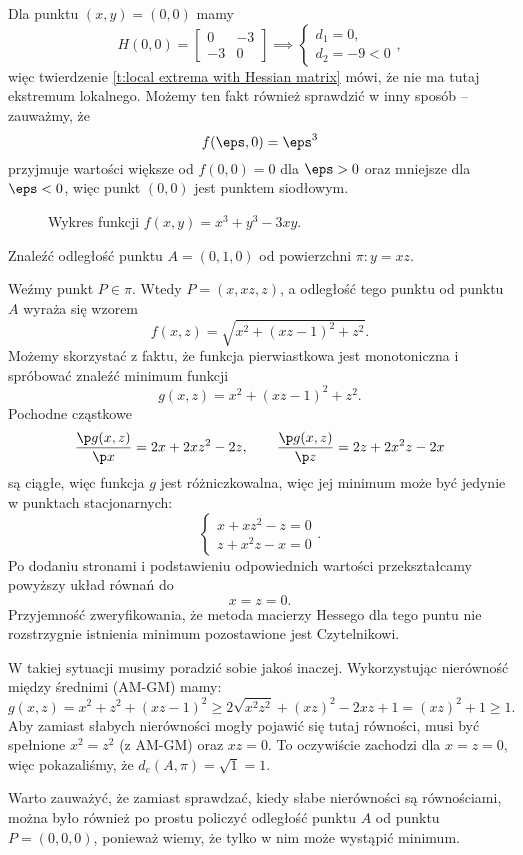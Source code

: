\begin{solution}
    Dla punktu $(x, y) = (0, 0)$ mamy
    \[ H(0, 0) = \begin{bmatrix}
        0 & -3 \\
        -3 & 0
    \end{bmatrix} \implies \begin{cases} d_1 = 0,\\ d_2 = -9 < 0 \end{cases}, \]
    więc twierdzenie \ref{t:local extrema with Hessian matrix} mówi, że nie ma tutaj ekstremum lokalnego. Możemy ten fakt również sprawdzić w inny sposób -- zauważmy, że
    \[ f(\eps, 0) = \eps^3 \]
    przyjmuje wartości większe od $f(0, 0) = 0$ dla $\eps > 0$ oraz mniejsze dla $\eps < 0$, więc punkt $(0, 0)$ jest punktem siodłowym.
\end{solution}

\begin{figure}[H]
    \centering
    \caption{Wykres funkcji $f(x, y) = x^3 + y^3 - 3xy$.}
\end{figure}

\begin{example}
    Znaleźć odległość punktu $A = (0, 1, 0)$ od powierzchni $\pi : y = xz$.
\end{example}
\begin{solution}
    Weźmy punkt $P \in \pi$. Wtedy $P = (x, xz, z)$, a odległość tego punktu od punktu $A$ wyraża się wzorem
    \[ f(x, z) = \sqrt{x^2 + (xz- 1)^2 + z^2}. \]
    Możemy skorzystać z faktu, że funkcja pierwiastkowa jest monotoniczna i spróbować znaleźć minimum funkcji
    \[ g(x, z) = x^2 + (xz - 1)^2 + z^2. \]
    Pochodne cząstkowe
    \[ \frac{\p g(x, z)}{\p x} = 2x + 2xz^2 - 2z, \qquad \frac{\p g(x, z)}{\p z} = 2z + 2x^2z - 2x \]
    są ciągłe, więc funkcja $g$ jest różniczkowalna, więc jej minimum może być jedynie w punktach stacjonarnych:
    \[ \begin{cases} x + xz^2 - z = 0 \\ z + x^2z - x = 0 \end{cases}. \]
    Po dodaniu stronami i podstawieniu odpowiednich wartości przekształcamy powyższy układ równań do
    \[ x = z = 0. \]
    Przyjemność zweryfikowania, że metoda macierzy Hessego dla tego puntu nie rozstrzygnie istnienia minimum pozostawione jest Czytelnikowi.

    W takiej sytuacji musimy poradzić sobie jakoś inaczej. Wykorzystując nierówność między średnimi (AM-GM) mamy:
    \[ g(x, z) = x^2 + z^2 + (xz - 1)^2 \geq 2\sqrt{x^2z^2} + (xz)^2 - 2xz + 1 = (xz)^2 + 1 \geq 1. \]
    Aby zamiast słabych nierówności mogły pojawić się tutaj równości, musi być spełnione $x^2 = z^2$ (z AM-GM) oraz $xz = 0$. To oczywiście zachodzi dla $x = z = 0$, więc pokazaliśmy, że $d_e(A, \pi) = \sqrt{1} = 1$.
\end{solution}

Warto zauważyć, że zamiast sprawdzać, kiedy słabe nierówności są równościami, można było również po prostu policzyć odległość punktu $A$ od punktu $P = (0, 0, 0)$, ponieważ wiemy, że tylko w nim może wystąpić minimum.